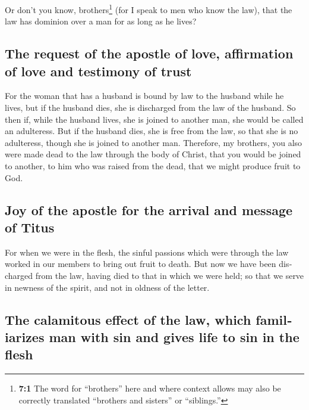 \begin{paracol}{2}
\begin{otherlanguage}{english}
 Or don't you know, brothers\footnote{\textbf{7:1} The
  word for ``brothers'' here and where context allows may also be
  correctly translated ``brothers and sisters'' or ``siblings.''} (for I
speak to men who know the law), that the law has dominion over a man for
as long as he lives?

\hypertarget{the-request-of-the-apostle-of-love-affirmation-of-love-and-testimony-of-trust}{%
\subsection{The request of the apostle of love, affirmation of love and
testimony of
trust}\label{the-request-of-the-apostle-of-love-affirmation-of-love-and-testimony-of-trust}}

 For the woman that has a husband is bound by law to the
husband while he lives, but if the husband dies, she is discharged from
the law of the husband.  So then if, while the husband
lives, she is joined to another man, she would be called an adulteress.
But if the husband dies, she is free from the law, so that she is no
adulteress, though she is joined to another man. 
Therefore, my brothers, you also were made dead to the law through the
body of Christ, that you would be joined to another, to him who was
raised from the dead, that we might produce fruit to God.

\hypertarget{joy-of-the-apostle-for-the-arrival-and-message-of-titus}{%
\subsection{Joy of the apostle for the arrival and message of
Titus}\label{joy-of-the-apostle-for-the-arrival-and-message-of-titus}}

 For when we were in the flesh, the sinful passions which
were through the law worked in our members to bring out fruit to death.
 But now we have been discharged from the law, having died
to that in which we were held; so that we serve in newness of the
spirit, and not in oldness of the letter.

\hypertarget{the-calamitous-effect-of-the-law-which-familiarizes-man-with-sin-and-gives-life-to-sin-in-the-flesh}{%
\subsection{The calamitous effect of the law, which familiarizes man
with sin and gives life to sin in the
flesh}\label{the-calamitous-effect-of-the-law-which-familiarizes-man-with-sin-and-gives-life-to-sin-in-the-flesh}}


\end{otherlanguage}
\end{paracol}
